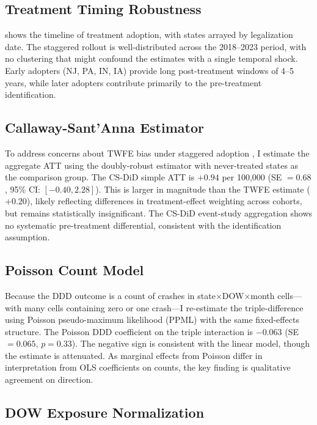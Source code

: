 \documentclass[12pt]{article}
\begin{document}
\subsection{Treatment Timing Robustness}

 shows the timeline of treatment adoption, with states arrayed by legalization date. The staggered rollout is well-distributed across the 2018--2023 period, with no clustering that might confound the estimates with a single temporal shock. Early adopters (NJ, PA, IN, IA) provide long post-treatment windows of 4--5 years, while later adopters contribute primarily to the pre-treatment identification.

\subsection{Callaway-Sant'Anna Estimator}

To address concerns about TWFE bias under staggered adoption \citep{sunabraham2021estimating, borusyak2024revisiting}, I estimate the aggregate ATT using the doubly-robust \citet{callaway2021difference} estimator with never-treated states as the comparison group. The CS-DiD simple ATT is $+0.94$ per 100,000 (SE $= 0.68$, 95\% CI: $[-0.40, 2.28]$). This is larger in magnitude than the TWFE estimate ($+0.20$), likely reflecting differences in treatment-effect weighting across cohorts, but remains statistically insignificant. The CS-DiD event-study aggregation shows no systematic pre-treatment differential, consistent with the identification assumption.

\subsection{Poisson Count Model}

Because the DDD outcome is a count of crashes in state$\times$DOW$\times$month cells---with many cells containing zero or one crash---I re-estimate the triple-difference using Poisson pseudo-maximum likelihood (PPML) with the same fixed-effects structure. The Poisson DDD coefficient on the triple interaction is $-0.063$ (SE $= 0.065$, $p = 0.33$). The negative sign is consistent with the linear model, though the estimate is attenuated. As marginal effects from Poisson differ in interpretation from OLS coefficients on counts, the key finding is qualitative agreement on direction.

\subsection{DOW Exposure Normalization}
\end{document}
